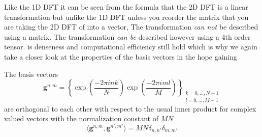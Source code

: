 \begin{Rem}
Like the 1D \ac{DFT} it can be seen from the formula that the 2D \ac{DFT} is a linear transformation but unlike the 1D \ac{DFT}
unless you reorder the matrix that you are taking the 2D \ac{DFT} of into a vector, The transformation \emph{can not} be described using a matrix. The transformation \emph{can be} described however using a 4th order tensor. 
is denseness and computational efficiency still hold which is why we again take a closer look at the properties of the basis vectors in the hope gaining
\end{Rem}

\begin{Prop}\label{Prop:2ddftbasisvectors}
    The basis  vectors
    \begin{equation}\label{eq:2ddftbasisvectors}
        \boldsymbol{g}^{n,m} = \left\{\exp\left({\frac{-2\pi ink}{N}}\right)\exp\left({\frac{-2\pi iml}{M}}\right)\right\}_{\substack{k=0,\ldots,N-1\\l=0,\ldots,M-1}}
    \end{equation}
    are orthogonal to each other with respect to the usual inner product for complex valued vectors 
    with the normalization constant of $MN$
    \begin{equation}
        \langle\boldsymbol{g}^{n,m},\boldsymbol{g}^{n',m'}\rangle= MN \delta_{n,n'}\delta_{m,m'}
    \end{equation}
\end{Prop}

